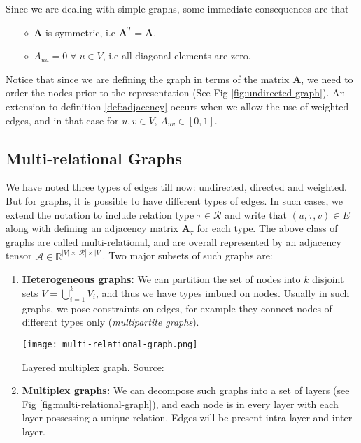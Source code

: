 Since we are dealing with simple graphs, some immediate consequences are that
\begin{itemize}
	\item[$\diamond$] $\mathbf{A}$ is symmetric, i.e $\mathbf{A}^T = \mathbf{A}$.
	\item[$\diamond$] $A_{uu} = 0 \; \forall \; u \in V$, i.e all diagonal elements are zero.
\end{itemize}
Notice that since we are defining the graph in terms of the matrix $\mathbf{A}$, we need to order the nodes prior to the representation (See Fig \ref{fig:undirected-graph}). An extension to definition \ref{def:adjacency} occurs when we allow the use of weighted edges, and in that case for $u, v \in V$, ${A}_{uv} \in [0, 1]$.

\subsection{Multi-relational Graphs}
We have noted three types of edges till now: undirected, directed and weighted. But for graphs, it is possible to have different types of edges. In such cases, we extend the notation to include relation type $\tau \in \mathcal{R}$ and write that $(u, \tau, v) \in E$ along with defining an adjacency matrix $\mathbf{A}_\tau$ for each type. The above class of graphs are called multi-relational, and are overall represented by an adjacency tensor $\mathcal{A} \in \mathbb{R}^{|V| \times |\mathcal{R}| \times |V|}$. Two major subsets of such graphs are:
\begin{enumerate}
	\item \textbf{Heterogeneous graphs:} We can partition the set of nodes into $k$ disjoint sets $V = \bigcup_{i=1}^k V_i$, and thus we have types imbued on nodes. 
	Usually in such graphs, we pose constraints on edges, for example they connect nodes of different types only (\textit{multipartite graphs}).
	\begin{marginfigure}
		\texttt{[image: multi-relational-graph.png]}
		\caption{Layered multiplex graph. Source: \cite{multiplexgraph}}
		\label{fig:multi-relational-graph}
	\end{marginfigure}
	\item \textbf{Multiplex graphs: }We can decompose such graphs into a set of layers (see Fig \ref{fig:multi-relational-graph}), and each node is in every layer with each layer possessing a unique relation. Edges will be present intra-layer and inter-layer.
\end{enumerate}

